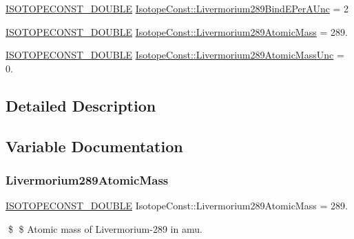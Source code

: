 \begin{DoxyCompactItemize}
\item 
\mbox{\hyperlink{group___isotope_const-_macros_ga8f45a7272ce02c0b4c65c44636ed719a}{I\+S\+O\+T\+O\+P\+E\+C\+O\+N\+S\+T\+\_\+\+D\+O\+U\+B\+LE}} \mbox{\hyperlink{group___isotope_const-_livermorium-_lv289_gaa677bc188c035b832e47f1d70b0d6c66}{Isotope\+Const\+::\+Livermorium289\+Bind\+E\+Per\+A\+Unc}} = 2
\item 
\mbox{\hyperlink{group___isotope_const-_macros_ga8f45a7272ce02c0b4c65c44636ed719a}{I\+S\+O\+T\+O\+P\+E\+C\+O\+N\+S\+T\+\_\+\+D\+O\+U\+B\+LE}} \mbox{\hyperlink{group___isotope_const-_livermorium-_lv289_ga33d2e5bf9c6acba4d3eb0ac0c812d012}{Isotope\+Const\+::\+Livermorium289\+Atomic\+Mass}} = 289.
\item 
\mbox{\hyperlink{group___isotope_const-_macros_ga8f45a7272ce02c0b4c65c44636ed719a}{I\+S\+O\+T\+O\+P\+E\+C\+O\+N\+S\+T\+\_\+\+D\+O\+U\+B\+LE}} \mbox{\hyperlink{group___isotope_const-_livermorium-_lv289_gabc0c74fc572b772f401e257cc355b712}{Isotope\+Const\+::\+Livermorium289\+Atomic\+Mass\+Unc}} = 0.
\end{DoxyCompactItemize}


\subsection{Detailed Description}


\subsection{Variable Documentation}
\mbox{\label{group___isotope_const-_livermorium-_lv289_ga33d2e5bf9c6acba4d3eb0ac0c812d012}} 
\subsubsection{\texorpdfstring{Livermorium289\+Atomic\+Mass}{Livermorium289AtomicMass}}
{\footnotesize\ttfamily \mbox{\hyperlink{group___isotope_const-_macros_ga8f45a7272ce02c0b4c65c44636ed719a}{I\+S\+O\+T\+O\+P\+E\+C\+O\+N\+S\+T\+\_\+\+D\+O\+U\+B\+LE}} Isotope\+Const\+::\+Livermorium289\+Atomic\+Mass = 289.}

\$ \$ Atomic mass of Livermorium-\/289 in amu. \mbox{\label{group___isotope_const-_livermorium-_lv289_gabc0c74fc572b772f401e257cc355b712}} 
